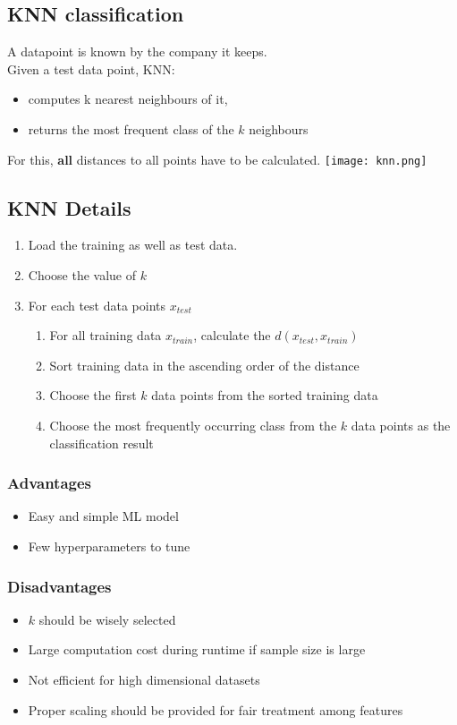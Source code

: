 \subsection{KNN classification}
A datapoint is known by the company it keeps.\\
Given a test data point, KNN:
\begin{itemize}
  \item computes k nearest neighbours of it,
  \item returns the most frequent class of the $k$ neighbours
\end{itemize}
For this, \textbf{all} distances to all points have to be calculated.
\texttt{[image: knn.png]}

\subsection{KNN Details}
\begin{enumerate}
  \item Load the training as well as test data.
  \item Choose the value of $k$
  \item For each test data points $x_{test}$
  \begin{enumerate}
    \item For all training data $x_{train}$, calculate the $d(x_{test},x_{train})$
    \item Sort training data in the ascending order of the distance
    \item Choose the first $k$ data points from the sorted training data
    \item Choose the most frequently occurring class from the $k$ data points as the classification result
  \end{enumerate}
\end{enumerate}

\subsubsection{Advantages}
\begin{itemize}
    \item Easy and simple ML model
    \item Few hyperparameters to tune
\end{itemize}

\subsubsection{Disadvantages}
\begin{itemize}
    \item $k$ should be wisely selected
    \item Large computation cost during runtime if sample size is large
    \item Not efficient for high dimensional datasets
    \item Proper scaling should be provided for fair treatment among features
\end{itemize}

